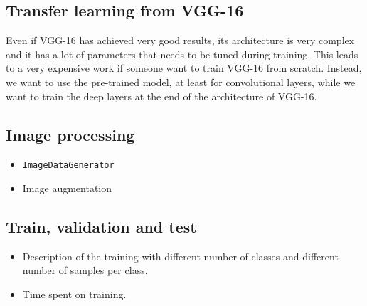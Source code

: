 \documentclass[12pt]{llncs}
\begin{document}
\subsection{Transfer learning from VGG-16}
Even if VGG-16 has achieved very good results, its architecture is very complex and it has a lot of parameters that needs to be tuned during training. This leads to a very expensive work if someone want to train VGG-16 from scratch. Instead, we want to use the pre-trained model, at least for convolutional layers, while we want to train the deep layers at the end of the architecture of VGG-16.

\subsection{Image processing}
\begin{itemize}
\item \texttt{ImageDataGenerator}
\item Image augmentation
\end{itemize}

\subsection{Train, validation and test}
\begin{itemize}
\item Description of the training with different number of classes and different number of samples per class.
\item Time spent on training.
\end{itemize}
\end{document}
